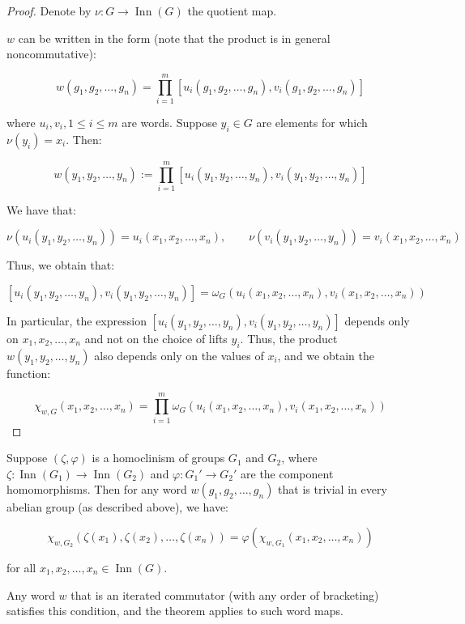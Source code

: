 \documentclass{ucetd}
\begin{document}
\begin{proof}
  Denote by $\nu:G \to \operatorname{Inn}(G)$ the quotient map.

  $w$ can be written in the form (note that the product is in general
  noncommutative):

  $$w(g_1,g_2,\dots,g_n) = \prod_{i=1}^m[u_i(g_1,g_2,\dots,g_n),v_i(g_1,g_2,\dots,g_n)]$$

  where $u_i,v_i, 1 \le i \le m$ are words. Suppose $y_i \in G$ are
  elements for which $\nu(y_i) = x_i$. Then:

  $$w(y_1,y_2,\dots,y_n) := \prod_{i=1}^m[u_i(y_1,y_2,\dots,y_n),v_i(y_1,y_2,\dots,y_n)]$$

  We have that:

  $$\nu(u_i(y_1,y_2,\dots,y_n)) = u_i(x_1,x_2,\dots,x_n), \qquad \nu(v_i(y_1,y_2,\dots,y_n)) = v_i(x_1,x_2,\dots,x_n)$$

  Thus, we obtain that:

  $$[u_i(y_1,y_2,\dots,y_n),v_i(y_1,y_2,\dots,y_n)] = \omega_G(u_i(x_1,x_2,\dots,x_n),v_i(x_1,x_2,\dots,x_n))$$

  In particular, the expression
  $[u_i(y_1,y_2,\dots,y_n),v_i(y_1,y_2,\dots,y_n)]$ depends only on
  $x_1,x_2,\dots,x_n$ and not on the choice of lifts $y_i$. Thus, the
  product $w(y_1,y_2,\dots,y_n)$ also depends only on the values of
  $x_i$, and we obtain the function:

  $$\chi_{w,G}(x_1,x_2,\dots,x_n) = \prod_{i=1}^m \omega_G(u_i(x_1,x_2,\dots,x_n),v_i(x_1,x_2,\dots,x_n))$$
\end{proof}


\begin{theorem}\label{thm:iterated-commutator-commutes-homoclinisms}
  Suppose $(\zeta,\varphi)$ is a homoclinism of groups $G_1$ and
  $G_2$, where $\zeta:\operatorname{Inn}(G_1) \to
  \operatorname{Inn}(G_2)$ and $\varphi:G_1' \to G_2'$ are the
  component homomorphisms. Then for any word $w(g_1,g_2,\dots,g_n)$
  that is trivial in every abelian group (as described above), we have:

  $$\chi_{w,G_2}(\zeta(x_1),\zeta(x_2),\dots,\zeta(x_n)) = \varphi(\chi_{w,G_1}(x_1,x_2,\dots,x_n))$$

  for all $x_1,x_2,\dots,x_n \in \operatorname{Inn}(G)$.

  Any word $w$ that is an iterated commutator (with any order of
  bracketing) satisfies this condition, and the theorem applies to
  such word maps.
\end{theorem}
\end{document}
